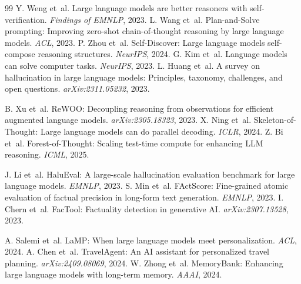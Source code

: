 \documentclass{article}
\begin{document}
\begin{thebibliography}{99}
 Y. Weng et~al. Large language models are better reasoners with self-verification. \emph{Findings of EMNLP}, 2023.
 L. Wang et~al. Plan-and-Solve prompting: Improving zero-shot chain-of-thought reasoning by large language models. \emph{ACL}, 2023.
 P. Zhou et~al. Self-Discover: Large language models self-compose reasoning structures. \emph{NeurIPS}, 2024.
 G. Kim et~al. Language models can solve computer tasks. \emph{NeurIPS}, 2023.
 L. Huang et~al. A survey on hallucination in large language models: Principles, taxonomy, challenges, and open questions. \emph{arXiv:2311.05232}, 2023.

 B. Xu et~al. ReWOO: Decoupling reasoning from observations for efficient augmented language models. \emph{arXiv:2305.18323}, 2023.
 X. Ning et~al. Skeleton-of-Thought: Large language models can do parallel decoding. \emph{ICLR}, 2024.
 Z. Bi et~al. Forest-of-Thought: Scaling test-time compute for enhancing LLM reasoning. \emph{ICML}, 2025.

 J. Li et~al. HaluEval: A large-scale hallucination evaluation benchmark for large language models. \emph{EMNLP}, 2023.
 S. Min et~al. FActScore: Fine-grained atomic evaluation of factual precision in long-form text generation. \emph{EMNLP}, 2023.
 I. Chern et~al. FacTool: Factuality detection in generative AI. \emph{arXiv:2307.13528}, 2023.

 A. Salemi et~al. LaMP: When large language models meet personalization. \emph{ACL}, 2024.
 A. Chen et~al. TravelAgent: An AI assistant for personalized travel planning. \emph{arXiv:2409.08069}, 2024.
 W. Zhong et~al. MemoryBank: Enhancing large language models with long-term memory. \emph{AAAI}, 2024.


\end{thebibliography}
\end{document}
